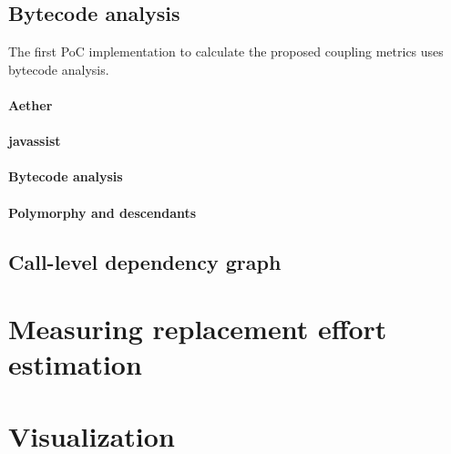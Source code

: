 \subsection{Bytecode analysis}
The first PoC implementation to calculate the proposed coupling metrics uses bytecode analysis.

\paragraph{Aether}

\paragraph{javassist}

\paragraph{Bytecode analysis}

\paragraph{Polymorphy and descendants}


\subsection{Call-level dependency graph}


\section{Measuring replacement effort estimation}

\section{Visualization}
